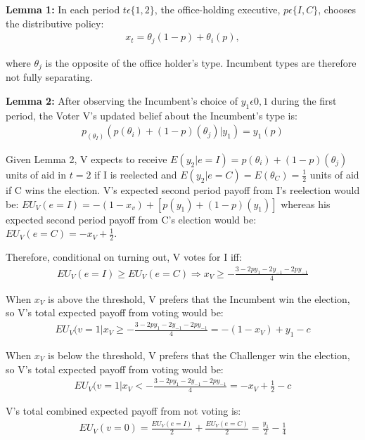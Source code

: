 \documentclass[12pt]{paper}
\begin{document}
\textbf{Lemma 1:} In each period $t \epsilon \{1,2\}$, the office-holding executive, $p \epsilon \{I,C\}$, chooses the distributive policy: 
\begin{gather}
x_t=\theta_j (1-p)+ \theta_i (p), 
\end{gather}

where $\theta_j$ is the opposite of the office holder’s type. Incumbent types are therefore not fully separating.

\textbf{Lemma 2:}  After observing the Incumbent’s choice of $y_1 \epsilon {0,1}$ during the first period, the Voter V’s updated belief about the Incumbent’s type is: 
\begin{gather}
p_{(\theta_I)}(p(\theta_i ) + (1 - p)(\theta_j ) | y_1 )=y_1(p)
\end{gather}

Given Lemma 2, V expects to receive $E(y_2 | e=I) = p(\theta_i )+(1-p)(\theta_j)$ units of aid in $t=2$ if I is reelected and $E(y_2 |e=C)=E(\theta_C )=\frac{1}{2}$ units of aid if C wins the election.  V’s expected second period payoff from I’s reelection would be: $EU_V (e=I) = -(1 - x_v ) + [p(y_1 ) + (1 - p)(y_1 )]$ whereas his expected second period payoff from C’s election would be: $EU_V (e=C) = - x_V + \frac{1}{2}$. 

Therefore, conditional on turning out, V votes for I iff: 
\begin{gather}
EU_V (e=I) \geq EU_V (e=C) \Rightarrow
x_V \geq -\frac{3 - 2py_1 - 2y_{-1} - 2py_{-1}}{4}
\end{gather}

When $x_V$ is above the threshold, V prefers that the Incumbent win the election, so V’s total expected payoff from voting would be:
\begin{gather}
 EU_V (v=1 | x_V \geq -\frac{3 - 2py_1 - 2y_{-1} - 2py_{-1}}{4} =
  - (1 - x_V ) + y_1 - c
\end{gather}

When $x_V$ is below the threshold, V prefers that the Challenger win the election, so V’s total expected payoff from voting would be:
\begin{gather}
 EU_V (v=1 | x_V < -\frac{3 - 2py_1 - 2y_{-1} - 2py_{-1}}{4} = 
  -x_V + \frac{1}{2} - c
\end{gather}

V’s total combined expected payoff from not voting is:
\begin{gather}
EU_V (v=0) = \frac{EU_V (e=I)}{2} + \frac{EU_V (e=C)}{2} = 
\frac{y_1}{2} - \frac{1}{4}
\end{gather}
\end{document}
